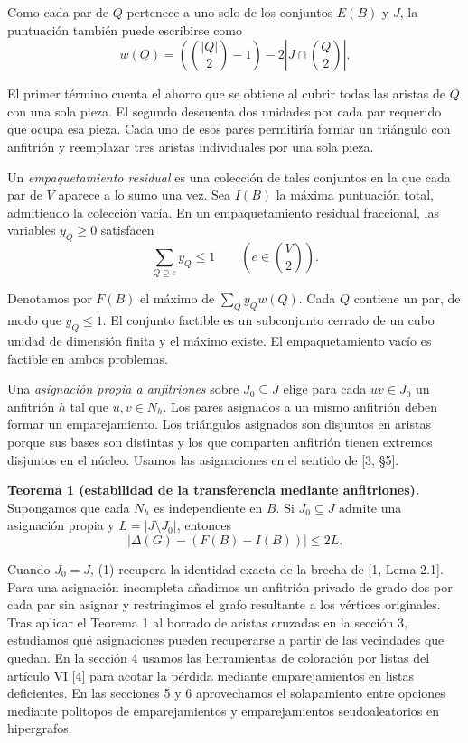 \documentclass[spanish,11pt,a4paper]{article}
\begin{document}
Como cada par de \(Q\) pertenece a uno solo de los conjuntos \(E(B)\) y \(J\), la puntuación también puede escribirse como \[
w(Q)=\left(\binom{|Q|}{2}-1\right)-2\left|J\cap\binom{Q}{2}\right|.
\]

El primer término cuenta el ahorro que se obtiene al cubrir todas las aristas de \(Q\) con una sola pieza. El segundo descuenta dos unidades por cada par requerido que ocupa esa pieza. Cada uno de esos pares permitiría formar un triángulo con anfitrión y reemplazar tres aristas individuales por una sola pieza.

Un \emph{empaquetamiento residual} es una colección de tales conjuntos en la que cada par de \(V\) aparece a lo sumo una vez. Sea \(I(B)\) la máxima puntuación total, admitiendo la colección vacía. En un empaquetamiento residual fraccional, las variables \(y_Q\ge0\) satisfacen
\[
\sum_{Q\supseteq e}y_Q\le1 \qquad \left(e\in\binom{V}{2}\right).
\]

Denotamos por \(F(B)\) el máximo de \(\sum_Q y_Qw(Q)\). Cada \(Q\) contiene un par, de modo que \(y_Q\le1\). El conjunto factible es un subconjunto cerrado de un cubo unidad de dimensión finita y el máximo existe. El empaquetamiento vacío es factible en ambos problemas.

Una \emph{asignación propia a anfitriones} sobre \(J_0\subseteq J\) elige para cada \(uv\in J_0\) un anfitrión \(h\) tal que \(u,v\in N_h\). Los pares asignados a un mismo anfitrión deben formar un emparejamiento. Los triángulos asignados son disjuntos en aristas porque sus bases son distintas y los que comparten anfitrión tienen extremos disjuntos en el núcleo. Usamos las asignaciones en el sentido de {[}3, §5{]}.

\textbf{Teorema 1 (estabilidad de la transferencia mediante anfitriones).} Supongamos que cada \(N_h\) es independiente en \(B\). Si \(J_0\subseteq J\) admite una asignación propia y \(L=|J\setminus J_0|\), entonces
\[
\big|\Delta(G)-(F(B)-I(B))\big|\le 2L. \tag{1}
\]

Cuando \(J_0=J\), (1) recupera la identidad exacta de la brecha de {[}1, Lema 2.1{]}. Para una asignación incompleta añadimos un anfitrión privado de grado dos por cada par sin asignar y restringimos el grafo resultante a los vértices originales. Tras aplicar el Teorema 1 al borrado de aristas cruzadas en la sección 3, estudiamos qué asignaciones pueden recuperarse a partir de las vecindades que quedan. En la sección 4 usamos las herramientas de coloración por listas del artículo VI {[}4{]} para acotar la pérdida mediante emparejamientos en listas deficientes. En las secciones 5 y 6 aprovechamos el solapamiento entre opciones mediante politopos de emparejamientos y emparejamientos seudoaleatorios en hipergrafos.
\end{document}
